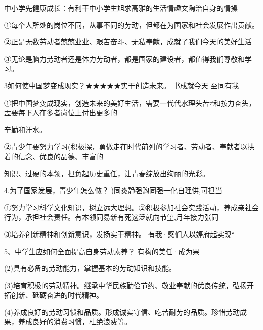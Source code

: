 \documentclass[lang=cn,11pt]{elegantbook}
\newcommand{\daofasym}[1]{{\daofasymbolfont #1}}
\newcommand{\daofasym}[1]{#1}
\begin{document}
中小学先健康成长：有利干中小学生旭求高雅的生活情趣文陶治自身的情操\par

\daofasym{①}每个人所处的岗位不同，从事不同的劳动，但都在为国家和社会发展作出贡献。\par

\daofasym{②}正是无数劳动者兢兢业业、艰苦奋斗、无私奉献，成就了我们今天的美好生活\par

\daofasym{③}无论是脑力劳动者还是体力劳动者，都是国家的建设者，都值得我们尊敬和学习。\par

3如何使中国梦变成现实？\daofasym{★}\daofasym{★}\daofasym{★}\daofasym{★}\daofasym{★}实干创造未来。 书成就今天 至同有我\par

\daofasym{①}把中国梦变成现实，创造未来的美好生活，需要一代代水理头苦≠和按力奋头，盂要每下人在多者岗位上付出更多的\par

辛勤和汗水。\par

\daofasym{②}青少年要努力学习(积极探，勇做走在时代前列的学习者、劳动者、奉献者以拱着的信念、优良的品德、丰富的\par

知识、过硬的本领，担负起历史重任，让青春绽放出绚丽的光彩。\par

4.为了国家发展，青少年怎么做？ )同炎静强购同强一化自理供,可担当\par

\daofasym{①}努力学习科学文化知识，树立远大理想。\daofasym{②}积极参加社会实践活动，养成亲社会行为，承担社会责任。有本领同易新有死这泛就向节望,月年接力张同\par

\daofasym{③}培养创新精神和创新意识，发扬实干精神。 有我·感们人以婷府起实现“\par

5、中学生应如何全面提高自身劳动素养？ 有构的美任·成为果\par

(2)具有必备的劳动能力，掌握基本的劳动知识和技能。\par

(3)培育积极的劳动精神。继承中华民族勤俭节约、敬业奉献的优良传统，弘扬开拓创新、砥砺奋进的时代精神。\par

(4)养成良好的劳动习惯和品质。形成诚实守信、吃苦耐劳的品质。珍惜劳动成果，养成良好的消费习惯，杜绝浪费等。\par
\end{document}
